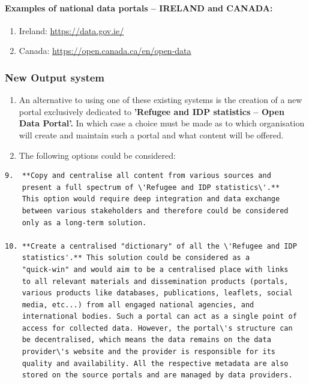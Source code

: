 \documentclass[
]{article}
\begin{document}
\hypertarget{examples-of-national-data-portals-ireland-and-canada-1}{%
\paragraph{Examples of national data portals -- IRELAND and CANADA:}\label{examples-of-national-data-portals-ireland-and-canada-1}}

\begin{enumerate}
\def\labelenumi{\roman{enumi}.}
\item
  Ireland: \url{https://data.gov.ie/}
\item
  Canada: \url{https://open.canada.ca/en/open-data}
\end{enumerate}

\hypertarget{new-output-system}{%
\subsubsection{New Output system}\label{new-output-system}}

\begin{enumerate}
\def\labelenumi{\arabic{enumi}.}
\setcounter{enumi}{504}
\item
  An alternative to using one of these existing systems is the
  creation of a new portal exclusively dedicated to \textbf{'Refugee and
  IDP statistics -- Open Data Portal'.} In which case a choice must
  be made as to which organisation will create and maintain such a
  portal and what content will be offered.
\item
  The following options could be considered:
\end{enumerate}

\begin{verbatim}
9.  **Copy and centralise all content from various sources and
    present a full spectrum of \'Refugee and IDP statistics\'.**
    This option would require deep integration and data exchange
    between various stakeholders and therefore could be considered
    only as a long-term solution.

10. **Create a centralised "dictionary" of all the \'Refugee and IDP
    statistics'.** This solution could be considered as a
    "quick-win" and would aim to be a centralised place with links
    to all relevant materials and dissemination products (portals,
    various products like databases, publications, leaflets, social
    media, etc...) from all engaged national agencies, and
    international bodies. Such a portal can act as a single point of
    access for collected data. However, the portal\'s structure can
    be decentralised, which means the data remains on the data
    provider\'s website and the provider is responsible for its
    quality and availability. All the respective metadata are also
    stored on the source portals and are managed by data providers.
\end{verbatim}
\end{document}
